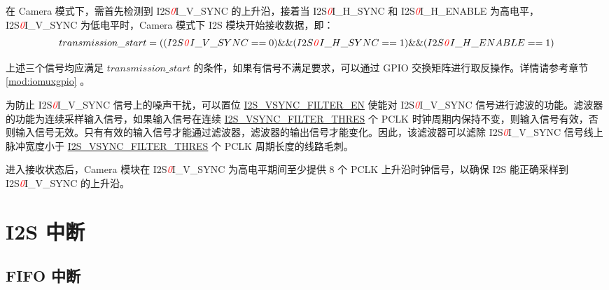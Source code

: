 \documentclass[main\_\_CN.tex]{subfiles}
\begin{document}
在 Camera 模式下，需首先检测到 I2S\textcolor{red}{\it{0}}I\_V\_SYNC 的上升沿，接着当 I2S\textcolor{red}{\it{0}}I\_H\_SYNC 和 I2S\textcolor{red}{\it{0}}I\_H\_ENABLE 为高电平，I2S\textcolor{red}{\it{0}}I\_V\_SYNC 为低电平时，Camera 模式下 I2S 模块开始接收数据，即：
$$transmission\_start= (  (  I2S\textcolor{red}{\it{0}}I\_V\_SYNC==0 ) \&\& (I2S\textcolor{red}{\it{0}}I\_H\_SYNC==1) \&\& ( I2S\textcolor{red}{\it{0}}I\_H\_ENABLE==1 ) $$ \label{start-signal}

上述三个信号均应满足 $transmission\_start$ 的条件，如果有信号不满足要求，可以通过 GPIO 交换矩阵进行取反操作。详情请参考章节 \ref{mod:iomuxgpio} \textit{}。

为防止 I2S\textcolor{red}{\it{0}}I\_V\_SYNC 信号上的噪声干扰，可以置位 \hyperref[fielddesc:I2SVSYNCFILTEREN]{I2S\_VSYNC\_FILTER\_EN} 使能对 I2S\textcolor{red}{\it{0}}I\_V\_SYNC 信号进行滤波的功能。滤波器的功能为连续采样输入信号，如果输入信号在连续 \hyperref[fielddesc:I2SVSYNCFILTERTHRES]{I2S\_VSYNC\_FILTER\_THRES} 个 PCLK 时钟周期内保持不变，则输入信号有效，否则输入信号无效。只有有效的输入信号才能通过滤波器，滤波器的输出信号才能变化。因此，该滤波器可以滤除 I2S\textcolor{red}{\it{0}}I\_V\_SYNC 信号线上脉冲宽度小于 \hyperref[fielddesc:I2SVSYNCFILTERTHRES]{I2S\_VSYNC\_FILTER\_THRES} 个 PCLK 周期长度的线路毛刺。

进入接收状态后，Camera 模块在 I2S\textcolor{red}{\it{0}}I\_V\_SYNC 为高电平期间至少提供 8 个 PCLK 上升沿时钟信号，以确保 I2S 能正确采样到 I2S\textcolor{red}{\it{0}}I\_V\_SYNC 的上升沿。


\section{I2S 中断} \label{I2S_INT}
\subsection{FIFO 中断}
\end{document}
